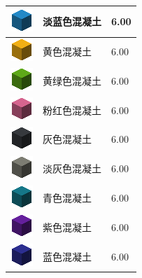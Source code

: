 \documentclass[UTF8]{ctexart}
\begin{document}
\begin{longtable}[]{|p{1cm}|p{8cm}|p{1.5cm}|}
	\hline
	\includegraphics{.workspace/icons/minecraft/minecraft__concrete__3.png} & 淡蓝色混凝土 &6.00\\
	\hline
	\includegraphics{.workspace/icons/minecraft/minecraft__concrete__4.png} & 黄色混凝土 &6.00\\
	\hline
	\includegraphics{.workspace/icons/minecraft/minecraft__concrete__5.png} & 黄绿色混凝土 &6.00\\
	\hline
	\includegraphics{.workspace/icons/minecraft/minecraft__concrete__6.png} & 粉红色混凝土 &6.00\\
	\hline
	\includegraphics{.workspace/icons/minecraft/minecraft__concrete__7.png} & 灰色混凝土 &6.00\\
	\hline
	\includegraphics{.workspace/icons/minecraft/minecraft__concrete__8.png} & 淡灰色混凝土 &6.00\\
	\hline
	\includegraphics{.workspace/icons/minecraft/minecraft__concrete__9.png} & 青色混凝土 &6.00\\
	\hline
	\includegraphics{.workspace/icons/minecraft/minecraft__concrete__10.png} & 紫色混凝土 &6.00\\
	\hline
	\includegraphics{.workspace/icons/minecraft/minecraft__concrete__11.png} & 蓝色混凝土 &6.00\\

\end{longtable}
\end{document}
